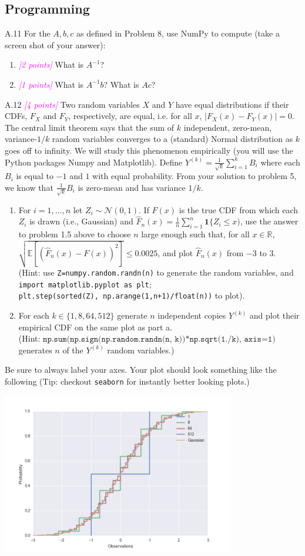 \documentclass{article}
\newcommand{\field}[1]{\mathbb{#1}}
\newcommand{\1}{\mathbf{1}}
\newcommand{\E}{\mathbb{E}}
\newcommand{\R}{\field{R}} %
\newcommand{\points}[1]{\small\textcolor{magenta}{\emph{[#1 points]}} \normalsize}
\begin{document}
\subsection*{Programming}

A.11 For the $A, b, c$ as defined in Problem 8, use
  NumPy to compute (take a screen shot of your answer):
  \begin{enumerate}
  \item \points{2} What is $A^{-1}$?
  \item \points{1} What is $A^{-1}b$? What is $Ac$?
  \end{enumerate}  


A.12 \points{4} Two random variables $X$ and $Y$ have equal
  distributions if their CDFs, $F_X$ and $F_Y$, respectively, are
  equal, i.e. for all $x$, $ |F_X(x) - F_Y(x)| = 0$. 
The central limit theorem says that the sum of $k$ independent,
zero-mean, variance-$1/k$ random variables converges to a (standard) Normal distribution as $k$ goes off to infinity.  
We will study this phenomenon empirically (you will use the Python packages Numpy and Matplotlib). 
Define $Y^{(k)} = \frac{1}{\sqrt{k}} \sum_{i=1}^k B_i$ where each $B_i$ is equal to $-1$ and $1$ with equal probability.
From your solution to problem 5, we know that $\frac{1}{\sqrt{k}} B_i$ is zero-mean and has variance $1/k$.
\begin{enumerate}
\item For $i=1,\dots,n$ let $Z_i \sim \mathcal{N}(0,1)$. If
  $F(x)$ is the true CDF from which each $Z_i$ is drawn (i.e.,
  Gaussian) and $\widehat{F}_n(x) = \frac{1}{n} \sum_{i=1}^n
  \1\{ Z_i \leq x)$, use the answer to problem 1.5  above to choose
  $n$ large enough such that, for all $x \in \R$, $ \sqrt{\E[
    (\widehat{F}_n(x)-F(x))^2 ]} \leq 0.0025$, and plot
  $\widehat{F}_n(x)$ from $-3$ to $3$. \\(Hint: use
  \texttt{Z=numpy.random.randn(n)} to generate the random
  variables, and \texttt{import matplotlib.pyplot as plt};\\
  \texttt{plt.step(sorted(Z), np.arange(1,n+1)/float(n))} to
  plot). 
\item For each $k \in \{1, 8, 64, 512\}$ generate $n$
  independent copies $Y^{(k)}$ and plot their empirical CDF on
  the same plot as part a.\\ (Hint: 
  $\texttt{np.sum(np.sign(np.random.randn(n,
    k))*np.sqrt(1./k), axis=1)}$ generates $n$ of the
  $Y^{(k)}$ random variables.) 
\end{enumerate}
Be sure to always label your axes. 
Your plot should look something like the following (Tip: checkout \texttt{seaborn} for instantly better looking plots.)

\begin{center}
\includegraphics[width=4in]{full.png}
\end{center} 
\end{document}
